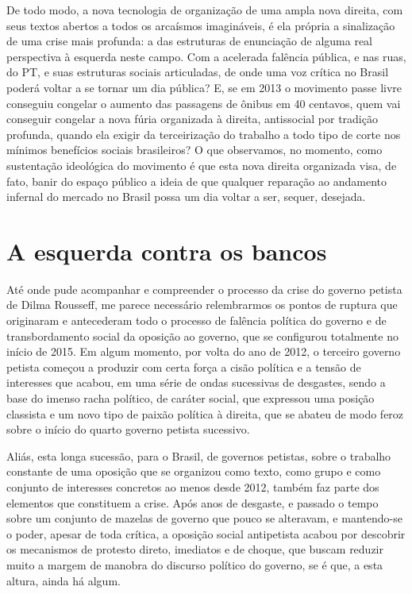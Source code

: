De todo modo, a nova tecnologia de organização de uma ampla nova
direita, com seus textos abertos a todos os arcaísmos imagináveis, é ela
própria a sinalização de uma crise mais profunda: a das estruturas de
enunciação de alguma real perspectiva à esquerda neste campo. Com a
acelerada falência pública, e nas ruas, do PT, e suas estruturas sociais
articuladas, de onde uma voz crítica no Brasil poderá voltar a se tornar
um dia pública? E, se em 2013 o movimento passe livre conseguiu congelar
o aumento das passagens de ônibus em 40 centavos, quem vai conseguir
congelar a nova fúria organizada à direita, antissocial por tradição
profunda, quando ela exigir da terceirização do trabalho a todo tipo de
corte nos mínimos benefícios sociais brasileiros? O que observamos, no
momento, como sustentação ideológica do movimento é que esta nova
direita organizada visa, de fato, banir do espaço público a ideia de que
qualquer reparação ao andamento infernal do mercado no Brasil possa um
dia voltar a ser, sequer, desejada.

\chapter{A esquerda contra os
bancos}\label{a-esquerda-contra-os-bancos}

Até onde pude acompanhar e compreender o processo da crise do governo
petista de Dilma Rousseff, me parece necessário relembrarmos os pontos
de ruptura que originaram e antecederam todo o processo de falência
política do governo e de transbordamento social da oposição ao governo,
que se configurou totalmente no início de 2015. Em algum momento, por
volta do ano de 2012, o terceiro governo petista começou a produzir com
certa força a cisão política e a tensão de interesses que acabou, em uma
série de ondas sucessivas de desgastes, sendo a base do imenso racha
político, de caráter social, que expressou uma posição classista e um
novo tipo de paixão política à direita, que se abateu de modo feroz
sobre o início do quarto governo petista sucessivo.

Aliás, esta longa sucessão, para o Brasil, de governos petistas, sobre o
trabalho constante de uma oposição que se organizou como texto, como
grupo e como conjunto de interesses concretos ao menos desde 2012,
também faz parte dos elementos que constituem a crise. Após anos de
desgaste, e passado o tempo sobre um conjunto de mazelas de governo que
pouco se alteravam, e mantendo-se o poder, apesar de toda crítica, a
oposição social antipetista acabou por descobrir os mecanismos de
protesto direto, imediatos e de choque, que buscam reduzir muito a
margem de manobra do discurso político do governo, se é que, a esta
altura, ainda há algum.

